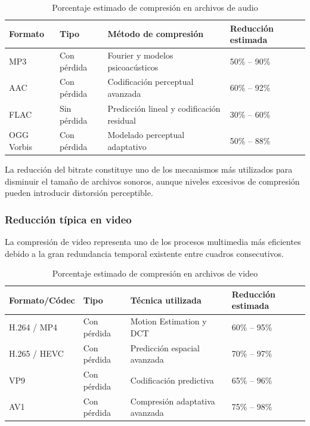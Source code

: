 \documentclass[12pt, oneside, letterpaper]{book}
\begin{document}
\begin{table}[H]
\centering
\caption{Porcentaje estimado de compresión en archivos de audio}
\label{tab:compresion_audio}
\renewcommand{\arraystretch}{1.4}
\begin{tabularx}{\textwidth}{|p{3cm}|p{3cm}|X|p{3cm}|}
\hline
\textbf{Formato} & \textbf{Tipo} & \textbf{Método de compresión} & \textbf{Reducción estimada} \\
\hline

MP3 & Con pérdida & Fourier y modelos psicoacústicos & 50\% -- 90\% \\
\hline

AAC & Con pérdida & Codificación perceptual avanzada & 60\% -- 92\% \\
\hline

FLAC & Sin pérdida & Predicción lineal y codificación residual & 30\% -- 60\% \\
\hline

OGG Vorbis & Con pérdida & Modelado perceptual adaptativo & 50\% -- 88\% \\
\hline

\end{tabularx}
\end{table}

La reducción del bitrate constituye uno de los mecanismos más utilizados para disminuir el tamaño de archivos sonoros, aunque niveles excesivos de compresión pueden introducir distorsión perceptible.

\subsubsection{Reducción típica en video}

La compresión de video representa uno de los procesos multimedia más eficientes debido a la gran redundancia temporal existente entre cuadros consecutivos.

\begin{table}[H]
\centering
\caption{Porcentaje estimado de compresión en archivos de video}
\label{tab:compresion_video}
\renewcommand{\arraystretch}{1.4}
\begin{tabularx}{\textwidth}{|p{3cm}|p{3cm}|X|p{3cm}|}
\hline
\textbf{Formato/Códec} & \textbf{Tipo} & \textbf{Técnica utilizada} & \textbf{Reducción estimada} \\
\hline

H.264 / MP4 & Con pérdida & Motion Estimation y DCT & 60\% -- 95\% \\
\hline

H.265 / HEVC & Con pérdida & Predicción espacial avanzada & 70\% -- 97\% \\
\hline

VP9 & Con pérdida & Codificación predictiva & 65\% -- 96\% \\
\hline

AV1 & Con pérdida & Compresión adaptativa avanzada & 75\% -- 98\% \\
\hline

\end{tabularx}
\end{table}
\end{document}
